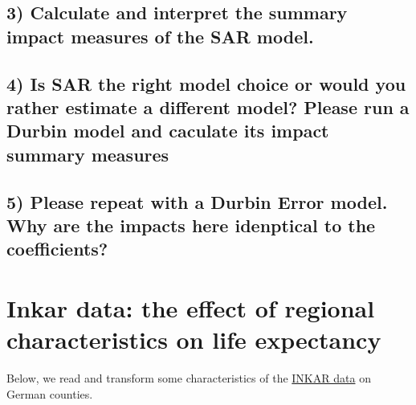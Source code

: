 \documentclass[
  letterpaper,
]{scrbook}
\begin{document}
\hypertarget{calculate-and-interpret-the-summary-impact-measures-of-the-sar-model.}{%
\subsection*{3) Calculate and interpret the summary impact measures of
the SAR
model.}\label{calculate-and-interpret-the-summary-impact-measures-of-the-sar-model.}}

\hypertarget{is-sar-the-right-model-choice-or-would-you-rather-estimate-a-different-model-please-run-a-durbin-model-and-caculate-its-impact-summary-measures}{%
\subsection*{4) Is SAR the right model choice or would you rather
estimate a different model? Please run a Durbin model and caculate its
impact summary
measures}\label{is-sar-the-right-model-choice-or-would-you-rather-estimate-a-different-model-please-run-a-durbin-model-and-caculate-its-impact-summary-measures}}

\hypertarget{please-repeat-with-a-durbin-error-model.-why-are-the-impacts-here-idenptical-to-the-coefficients}{%
\subsection*{5) Please repeat with a Durbin Error model. Why are the
impacts here idenptical to the
coefficients?}\label{please-repeat-with-a-durbin-error-model.-why-are-the-impacts-here-idenptical-to-the-coefficients}}

\hypertarget{inkar-data-the-effect-of-regional-characteristics-on-life-expectancy}{%
\section{Inkar data: the effect of regional characteristics on life
expectancy}\label{inkar-data-the-effect-of-regional-characteristics-on-life-expectancy}}

Below, we read and transform some characteristics of the
\href{https://www.inkar.de/}{INKAR data} on German counties.
\end{document}
